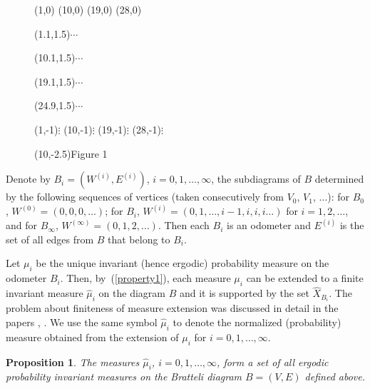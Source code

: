 \documentclass[11pt, english, reqno]{amsart}
\theoremstyle{definition}
\theoremstyle{remark}
\theoremstyle{plain}
\newtheorem{prop}[defin]{Proposition}
\def\wh{\widehat}
\numberwithin{equation}{section}
\begin{document}
{\begin{figure}[ht]
\begin{center}
\begin{graph}
(1,0)
(10,0)
(19,0)
(28,0)

\freetext(1.1,1.5){$\cdots$}

\freetext(10.1,1.5){$\cdots$}

\freetext(19.1,1.5){$\cdots$}

\freetext(24.9,1.5){$\cdots$}


\freetext(1,-1){$\vdots$}
\freetext(10,-1){$\vdots$}
\freetext(19,-1){$\vdots$}
\freetext(28,-1){$\vdots$}

\freetext(10,-2.5){Figure 1}

\end{graph}
\end{center}

\vspace{0.8 cm}
\end{figure}

Denote by $B_i = (W^{(i)}, E^{(i)})$, $i = 0,1,\ldots, \infty$, the
 subdiagrams of $B$ determined by the following sequences of vertices
 (taken consecutively from $V_0$, $V_1$, $\ldots$): for $B_0$,
 $W^{(0)} = (0,0,0, \ldots)$; for $B_i$,   $W^{(i)} = (0,1,\ldots,i-1,i,i,i
 \ldots)$ for $i = 1,2,\ldots$,  and for $B_{\infty}$,  $W^{(\infty)} =(0,1,2,
  \ldots)$. Then each $B_i$ is an odometer and $E^{(i)}$ is the set of all
  edges from $B$ that belong to $B_i$.

Let $\mu_i$ be the unique invariant (hence ergodic) probability measure on
 the odometer $B_i$. Then, by~(\ref{property1}), each measure $\mu_i$
  can
 be extended to a finite invariant measure $\wh{\mu}_i$ on the diagram $B$
 and it is supported by the set $\wh{X}_{B_i}$. The problem about
 finiteness of measure extension was discussed in detail in the papers
 \cite{BezuglyiKwiatkowskiMedynetsSolomyak2013},
 \cite{AdamskaBezuglyiKarpelKwiatkowski2016}. We use the same symbol
 $ \wh{\mu}_i$ to denote the normalized (probability)
measure obtained from the extension of $\mu_i$ for $i = 0,1,\ldots,\infty$.

\begin{prop}\label{countbl_erg_meas}
The measures $\wh{\mu}_i$, $i = 0, 1, \ldots, \infty$, form a set of all
ergodic probability invariant measures on the Bratteli diagram $B = (V,E)$
defined above.
\end{prop}

}
\end{document}
